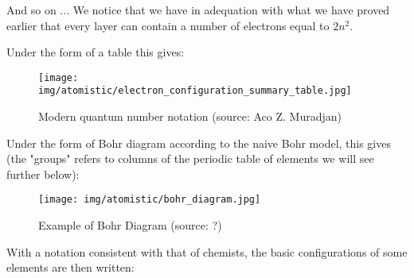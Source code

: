	And so on ... We notice that we have in adequation with what we have proved earlier that every layer can contain a number of electrons equal to $2n^2$.
	
	Under the form of a table this gives:
	\begin{figure}[H]
		\centering
		\texttt{[image: img/atomistic/electron\_configuration\_summary\_table.jpg]}
		\caption[Modern quantum number notation]{Modern quantum number notation (source: Aco Z. Muradjan)}
	\end{figure}

	Under the form of Bohr diagram according to the naive Bohr model, this gives (the "groups" refers to columns of the periodic table of elements we will see further below):
	\begin{figure}[H]
		\centering
		\texttt{[image: img/atomistic/bohr\_diagram.jpg]}
		\caption[Example of Bohr Diagram]{Example of Bohr Diagram (source: ?)}
	\end{figure}
	With a notation consistent with that of chemists, the basic configurations of some elements are then written:
